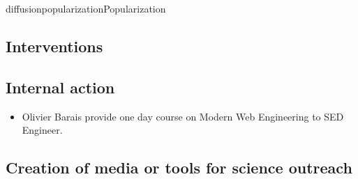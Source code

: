 \documentclass{ra2018}
\begin{document}
\begin{module}{diffusion}{popularization}{Popularization}
\subsection{Interventions}
      

\subsection{Internal action}
\begin{itemize}
\item Olivier Barais provide one day course on Modern Web Engineering to SED Engineer. 
\end{itemize}


\subsection{Creation of media or tools for science outreach}




\end{module}
\end{document}
